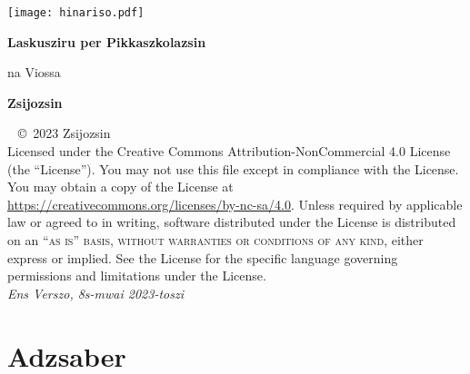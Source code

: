 \documentclass[12pt, a4paper]{legportokali}
\begin{document}

\onehalfspacing

\titlepage
{\texttt{[image: hinariso.pdf]}}
{
	\centering\sffamily
	{\Huge\bfseries Laskusziru per Pikkaszkolazsin \par}
	\vspace{16pt}
	{\LARGE na Viossa\par}
	\vspace{24pt}
	{\huge\bfseries Zsijozsin\par}
}

\thispagestyle{empty}
~\vfill
{
	\noindent \copyright\ 2023 Zsijozsin \\
		Licensed under the Creative Commons Attribution-NonCommercial 4.0 License (the ``License'').
		You may not use this file except in compliance with the License. You may obtain a copy of the
		License at \url{https://creativecommons.org/licenses/by-nc-sa/4.0}. Unless required by applicable
		law or agreed to in writing, software distributed under the License is distributed on an
		\textsc{``as is'' basis, without warranties or conditions of any kind}, either express or implied.
		See the License for the specific language governing permissions and limitations under the License. \\
	\textit{Ens Verszo, 8s-mwai 2023-toszi}
}

\pagestyle{empty}
\tableofcontents
\listoffigures
\listoftables

\pagestyle{fancy}
\cleardoublepage



\part{Adzsaber}

\end{document}
